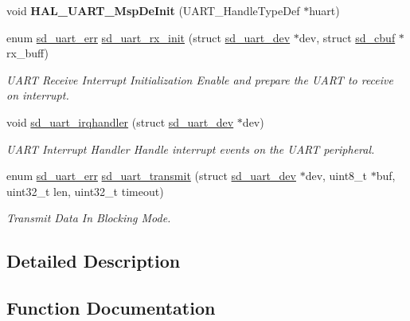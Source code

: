 \begin{DoxyCompactItemize}
void {\bfseries H\+A\+L\+\_\+\+U\+A\+R\+T\+\_\+\+Msp\+De\+Init} (U\+A\+R\+T\+\_\+\+Handle\+Type\+Def $\ast$huart)
\item 
enum \mbox{\hyperlink{group___s_d___u_a_r_t___types_gaff649a266fb34035c10733370c4fd104}{sd\+\_\+uart\+\_\+err}} \mbox{\hyperlink{group___s_d___u_a_r_t___functions_ga92a2dfada8629938854ad2fddff0d01d}{sd\+\_\+uart\+\_\+rx\+\_\+init}} (struct \mbox{\hyperlink{structsd__uart__dev}{sd\+\_\+uart\+\_\+dev}} $\ast$dev, struct \mbox{\hyperlink{structsd__cbuf}{sd\+\_\+cbuf}} $\ast$rx\+\_\+buff)
\begin{DoxyCompactList}\small\item\em U\+A\+RT Receive Interrupt Initialization Enable and prepare the U\+A\+RT to receive on interrupt. \end{DoxyCompactList}\item 
void \mbox{\hyperlink{group___s_d___u_a_r_t___functions_ga1464d7463564d0d7341a1cff71eb439d}{sd\+\_\+uart\+\_\+irqhandler}} (struct \mbox{\hyperlink{structsd__uart__dev}{sd\+\_\+uart\+\_\+dev}} $\ast$dev)
\begin{DoxyCompactList}\small\item\em U\+A\+RT Interrupt Handler Handle interrupt events on the U\+A\+RT peripheral. \end{DoxyCompactList}\item 
enum \mbox{\hyperlink{group___s_d___u_a_r_t___types_gaff649a266fb34035c10733370c4fd104}{sd\+\_\+uart\+\_\+err}} \mbox{\hyperlink{group___s_d___u_a_r_t___functions_ga8170b7c747d603b269242afa8de67164}{sd\+\_\+uart\+\_\+transmit}} (struct \mbox{\hyperlink{structsd__uart__dev}{sd\+\_\+uart\+\_\+dev}} $\ast$dev, uint8\+\_\+t $\ast$buf, uint32\+\_\+t len, uint32\+\_\+t timeout)
\begin{DoxyCompactList}\small\item\em Transmit Data In Blocking Mode. \end{DoxyCompactList}\end{DoxyCompactItemize}


\subsection{Detailed Description}


\subsection{Function Documentation}
\mbox{\label{group___s_d___u_a_r_t___functions_ga0e553b32211877322f949b14801bbfa7}} 
